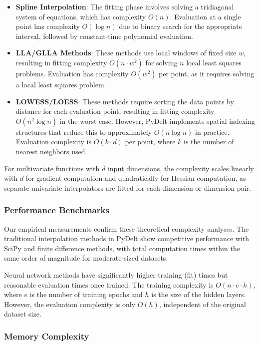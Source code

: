 \documentclass[10pt,journal,compsoc]{IEEEtran}
\begin{document}
\begin{itemize}
    \item \textbf{Spline Interpolation}: The fitting phase involves solving a tridiagonal system of equations, which has complexity $O(n)$. Evaluation at a single point has complexity $O(\log n)$ due to binary search for the appropriate interval, followed by constant-time polynomial evaluation.
    
    \item \textbf{LLA/GLLA Methods}: These methods use local windows of fixed size $w$, resulting in fitting complexity $O(n \cdot w^2)$ for solving $n$ local least squares problems. Evaluation has complexity $O(w^2)$ per point, as it requires solving a local least squares problem.
    
    \item \textbf{LOWESS/LOESS}: These methods require sorting the data points by distance for each evaluation point, resulting in fitting complexity $O(n^2 \log n)$ in the worst case. However, PyDelt implements spatial indexing structures that reduce this to approximately $O(n \log n)$ in practice. Evaluation complexity is $O(k \cdot d)$ per point, where $k$ is the number of nearest neighbors used.
\end{itemize}

For multivariate functions with $d$ input dimensions, the complexity scales linearly with $d$ for gradient computation and quadratically for Hessian computation, as separate univariate interpolators are fitted for each dimension or dimension pair.

\subsubsection{Performance Benchmarks}

Our empirical measurements confirm these theoretical complexity analyses. The traditional interpolation methods in PyDelt show competitive performance with SciPy and finite difference methods, with total computation times within the same order of magnitude for moderate-sized datasets.

Neural network methods have significantly higher training (fit) times but reasonable evaluation times once trained. The training complexity is $O(n \cdot e \cdot h)$, where $e$ is the number of training epochs and $h$ is the size of the hidden layers. However, the evaluation complexity is only $O(h)$, independent of the original dataset size.

\subsubsection{Memory Complexity}
\end{document}
